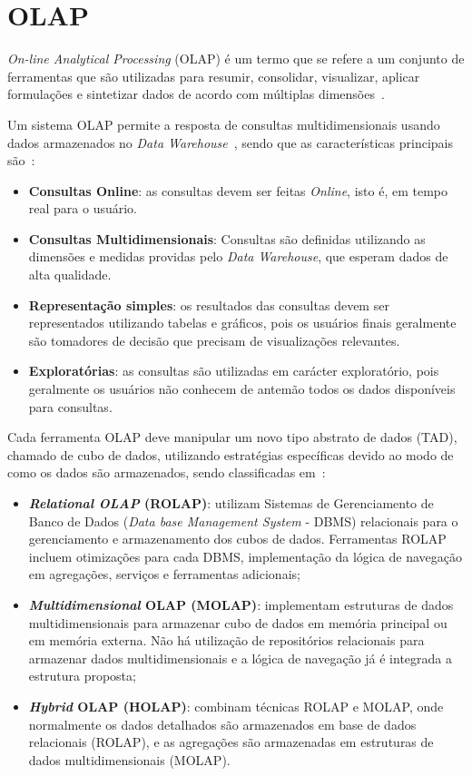 \section{OLAP}
\label{ch:fun:olap}

\textit{On-line Analytical Processing} (OLAP) é um termo que se refere a um conjunto de ferramentas que são utilizadas para resumir, consolidar, visualizar, aplicar formulações e sintetizar dados de acordo com múltiplas dimensões~\cite{coddProvidingOlapUseranalysts1998}.

Um sistema OLAP permite a resposta de consultas multidimensionais usando dados armazenados no \textit{Data Warehouse}~\cite{kimballDataWarehouseToolkit2013}, sendo que as características principais são~\cite{bimonteOpenIssuesBig2016}:

\begin{itemize}
	\item \textbf{Consultas Online}: as consultas devem ser feitas \textit{Online}, isto é, em tempo real para o usuário.
	\item \textbf{Consultas Multidimensionais}: Consultas são definidas utilizando as dimensões e medidas providas pelo \textit{Data Warehouse}, que esperam dados de alta qualidade.
	\item \textbf{Representação simples}: os resultados das consultas devem ser representados utilizando tabelas e gráficos, pois os usuários finais geralmente são tomadores de decisão que precisam de visualizações relevantes.
	\item \textbf{Exploratórias}: as consultas são utilizadas em carácter exploratório, pois geralmente os usuários não conhecem de antemão todos os dados disponíveis para consultas.
\end{itemize}

Cada ferramenta OLAP deve manipular um novo tipo abstrato de dados (TAD), chamado de cubo de dados, utilizando estratégias específicas devido ao modo de como os dados são armazenados, sendo classificadas em~\cite{moreiraFullPartialData2012}:

\begin{itemize}
	\item \textbf{\textit{Relational OLAP} (ROLAP)}: utilizam Sistemas de Gerenciamento de Banco de Dados (\textit{Data base Management System} - DBMS) relacionais para o gerenciamento e armazenamento dos cubos de dados.
Ferramentas ROLAP incluem otimizações para cada DBMS, implementação da lógica de navegação em agregações, serviços e ferramentas adicionais;
	\item \textbf{\textit{Multidimensional} OLAP (MOLAP)}: implementam estruturas de dados multidimensionais para armazenar cubo de dados em memória principal ou em memória externa.
Não há utilização de repositórios relacionais para armazenar dados multidimensionais e a lógica de navegação já é integrada a estrutura proposta;
	\item \textbf{\textit{Hybrid} OLAP (HOLAP)}: combinam técnicas ROLAP e MOLAP, onde normalmente os dados detalhados são armazenados em base de dados relacionais (ROLAP), e as agregações são armazenadas em estruturas de dados multidimensionais (MOLAP).
\end{itemize}

